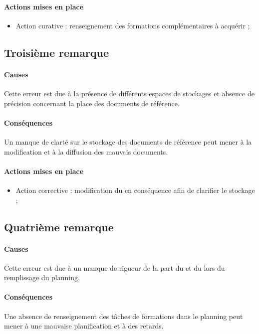 \documentclass[asi]{picInsa}
\begin{document}
\paragraph*{Actions mises en place} 
\begin{itemize}
\item Action curative : renseignement des formations complémentaires à acquérir ;
\end{itemize}


\subsection{Troisième remarque}
\paragraph*{Causes} Cette erreur est due à la présence de différents espaces de stockages et absence de précision concernant la place des documents de référence.

\paragraph*{Conséquences} Un manque de clarté sur le stockage des documents de référence peut mener à la modification et à la diffusion des mauvais documents.

\paragraph*{Actions mises en place}
\begin{itemize}
\item Action corrective : modification du \PGC{} en conséquence afin de clarifier le stockage ;
\end{itemize}

\subsection{Quatrième remarque}
\paragraph*{Causes} Cette erreur est due à un manque de rigueur de la part du \CP{} et du \CPA{} lors du remplissage du planning.

\paragraph*{Conséquences} Une absence de renseignement des tâches de formations dans le planning peut mener à une mauvaise planification et à des retards.
\end{document}
